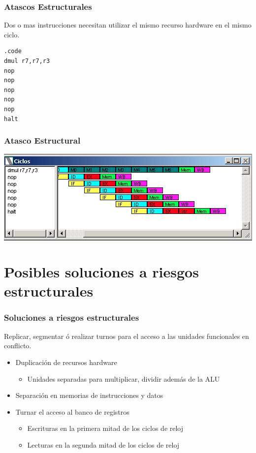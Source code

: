 \documentclass{beamer}
\begin{document}
\begin{frame}[fragile]
\frametitle{Atascos Estructurales}
Dos o mas instrucciones necesitan utilizar el mismo recurso hardware en el mismo ciclo.

\begin{block}{}
\begin{lstlisting}[basicstyle=\ttfamily,keywordstyle=\color{blue}]
.code
dmul r7,r7,r3
nop
nop
nop
nop
nop
halt
\end{lstlisting}
\end{block}
\end{frame}

\begin{frame}[fragile]
\frametitle{Atasco Estructural}
\includegraphics[scale=0.45]{atasco-estructural.png}
\end{frame}


\section{Posibles soluciones a riesgos estructurales}
\begin{frame}
\frametitle{Soluciones a riesgos estructurales}
Replicar, segmentar ó realizar turnos para el acceso a las unidades funcionales en conflicto.
\begin{itemize}
\item Duplicación de recursos hardware
\begin{itemize}
\item Unidades separadas para multiplicar, dividir además de la ALU
\end{itemize}
\item Separación en memorias de instrucciones y datos
\item Turnar el acceso al banco de registros
\begin{itemize}
\item Escrituras en la primera mitad de los ciclos de reloj
\item Lecturas en la segunda mitad de los ciclos de reloj
\end{itemize}
\end{itemize}
\end{frame}
\end{document}
